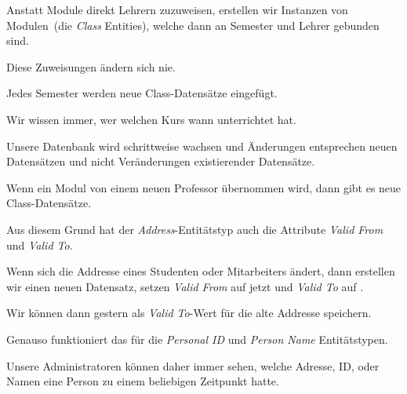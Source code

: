 \documentclass[aspectratio=169,mathserif,notheorems]{beamer}%
\begin{document}
\begin{frame}[t]
{\begin{itemize}
{\item<14-> Anstatt Module direkt Lehrern zuzuweisen, erstellen wir Instanzen von Modulen~(die \emph{Class} Entities), welche dann an Semester und Lehrer gebunden sind.%
}%
\item<15-> Diese Zuweisungen ändern sich nie.%
\item<16-> Jedes Semester werden neue Class-Datensätze eingefügt.%
\item<17-> Wir wissen immer, wer welchen Kurs wann unterrichtet hat.%
\item<18-> Unsere Datenbank wird schrittweise wachsen und Änderungen entsprechen neuen Datensätzen und nicht Veränderungen existierender Datensätze.%
\item<19-> Wenn ein Modul von einem neuen Professor übernommen wird, dann gibt es neue Class-Datensätze.%
\item<20-> Aus diesem Grund hat der \emph{Address}-Entitätstyp auch die Attribute \emph{Valid From} und \emph{Valid To}.%
\item<21-> Wenn sich die Addresse eines Studenten oder Mitarbeiters ändert, dann erstellen wir einen neuen Datensatz, setzen \emph{Valid From} auf jetzt und \emph{Valid To} auf .%
\item<22-> Wir können dann gestern als \emph{Valid To}-Wert für die alte Addresse speichern.%
\item<23-> Genauso funktioniert das für die \emph{Personal ID} und \emph{Person Name} Entitätstypen.%
\item<24-> Unsere Administratoren können daher immer sehen, welche Adresse, ID, oder Namen eine Person zu einem beliebigen Zeitpunkt hatte.%
\end{itemize}}%
\end{frame}%
%
\end{document}
